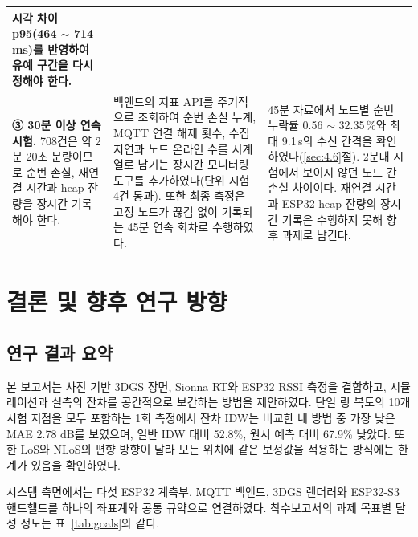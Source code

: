 \documentclass[11pt,a4paper]{article}
\begin{document}
{\begin{longtable}{@{}>{\raggedright\arraybackslash}p{3.6cm}
  >{\raggedright\arraybackslash}p{5.6cm}
  >{\raggedright\arraybackslash}p{5.7cm}@{}}
시각 차이 p95(464 $\sim$ 714\,ms)를 반영하여 유예 구간을 다시 정해야 한다. \\
\midrule
\textbf{③ 30분 이상 연속 시험.} 708건은 약 2분 20초 분량이므로 순번 손실, 재연결 시간과
heap 잔량을 장시간 기록해야 한다. &
백엔드의 지표 API를 주기적으로 조회하여 순번 손실 누계, MQTT 연결 해제 횟수, 수집 지연과 노드 온라인 수를 시계열로
남기는 장시간 모니터링 도구를 추가하였다(단위 시험 4건 통과). 또한 최종 측정은 고정 노드가 끊김 없이 기록되는 45분
연속 회차로 수행하였다. &
45분 자료에서 노드별 순번 누락률 0.56 $\sim$ 32.35\,\%와 최대 9.1\,s의 수신 간격을 확인하였다(\ref{sec:4.6}절).
2분대 시험에서 보이지 않던 노드 간 손실 차이이다. 재연결 시간과 ESP32 heap 잔량의 장시간 기록은 수행하지 못해 향후
과제로 남긴다. \\
\end{longtable}
}

\section{결론 및 향후 연구 방향}
\label{sec:5}

\subsection{연구 결과 요약}

본 보고서는 사진 기반 3DGS 장면, Sionna RT와 ESP32 RSSI 측정을 결합하고, 시뮬레이션과 실측의 잔차를 공간적으로 보간하는 방법을 제안하였다. 단일 링 복도의
10개 시험 지점을 모두 포함하는 1회 측정에서 잔차 IDW는 비교한 네 방법 중 가장 낮은 MAE 2.78 dB를 보였으며, 일반 IDW 대비 52.8\%, 원시 예측 대비
67.9\% 낮았다. 또한 LoS와 NLoS의 편향 방향이 달라 모든 위치에 같은 보정값을 적용하는 방식에는 한계가 있음을 확인하였다.

시스템 측면에서는 다섯 ESP32 계측부, MQTT 백엔드, 3DGS 렌더러와 ESP32-S3 핸드헬드를 하나의 좌표계와 공통 규약으로
연결하였다. 착수보고서의 과제 목표별 달성 정도는 표~\ref{tab:goals}와 같다.
\end{document}
